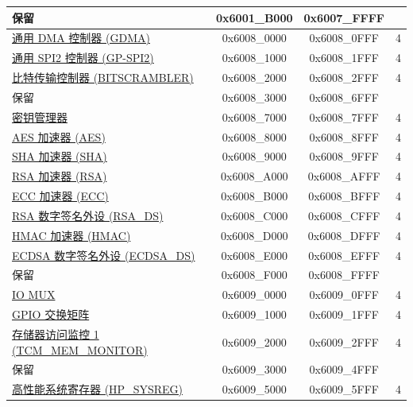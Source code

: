 \begin{ThreePartTable}
\begin{longtable}[c]{ |p{7cm}|c|c|r| }
        \rowcolor{gray!25}  保留                    & 0x6001\_B000 & 0x6007\_FFFF &        \\\hline
    \hyperref[mod:dma]{通用 DMA 控制器 (GDMA)}& 0x6008\_0000 & 0x6008\_0FFF &   4     \\\hline
    \hyperref[mod:spi]{通用 SPI2 控制器 (GP-SPI2)} & 0x6008\_1000 & 0x6008\_1FFF &   4     \\\hline
    \hyperref[mod:bitscrm]{比特传输控制器 (BITSCRAMBLER)}& 0x6008\_2000 & 0x6008\_2FFF &   4     \\\hline
        \rowcolor{gray!25}  保留                    & 0x6008\_3000 & 0x6008\_6FFF &         \\\hline
    \hyperref[mod:keymng]{密钥管理器} & 0x6008\_7000 & 0x6008\_7FFF &   4     \\\hline
    \hyperref[mod:aes]{AES 加速器 (AES)} & 0x6008\_8000 & 0x6008\_8FFF &   4     \\\hline
    \hyperref[mod:sha]{SHA 加速器 (SHA)} & 0x6008\_9000 & 0x6008\_9FFF &   4     \\\hline
    \hyperref[mod:rsa]{RSA 加速器 (RSA)}& 0x6008\_A000 & 0x6008\_AFFF &   4     \\\hline
    \hyperref[mod:ecc]{ECC 加速器 (ECC)}& 0x6008\_B000 & 0x6008\_BFFF &   4     \\\hline
    \hyperref[mod:digsig]{RSA 数字签名外设 (RSA\_DS)}  & 0x6008\_C000 & 0x6008\_CFFF &   4     \\\hline
    \hyperref[mod:hmac]{HMAC 加速器 (HMAC)}& 0x6008\_D000 & 0x6008\_DFFF &   4     \\\hline
    \hyperref[mod:ecdsa]{ECDSA 数字签名外设 (ECDSA\_DS)}& 0x6008\_E000 & 0x6008\_EFFF &   4     \\\hline
        \rowcolor{gray!25}  保留                    & 0x6008\_F000 & 0x6008\_FFFF &         \\\hline
    \hyperref[mod:iomuxgpio]{IO MUX}                      & 0x6009\_0000 & 0x6009\_0FFF &   4     \\\hline
    \hyperref[mod:iomuxgpio]{GPIO 交换矩阵}& 0x6009\_1000 & 0x6009\_1FFF &   4     \\\hline
    \hyperref[mod:dbgassist]{存储器访问监控 1 (TCM\_MEM\_MONITOR)} \tnote{\textcolor{red}{2}}                & 0x6009\_2000 & 0x6009\_2FFF &   4   \\\hline
        \rowcolor{gray!25}  保留                    & 0x6009\_3000 & 0x6009\_4FFF &         \\\hline
    \hyperref[mod:sysreg]{高性能系统寄存器 (HP\_SYSREG)}               & 0x6009\_5000 & 0x6009\_5FFF &   4     \\\hline

\end{longtable}
\end{ThreePartTable}
